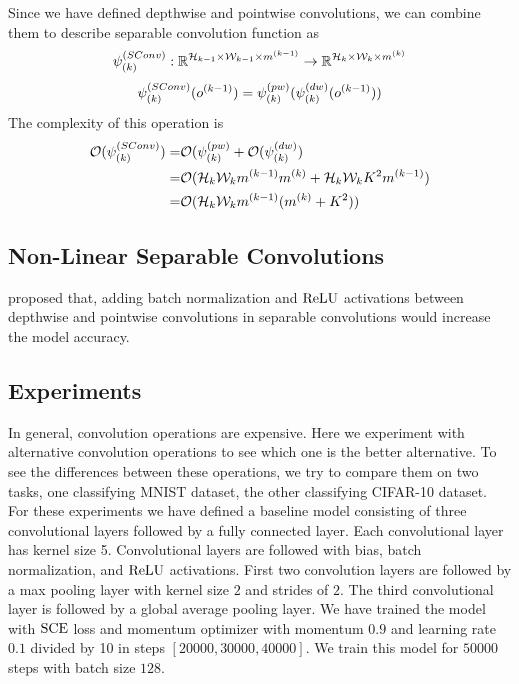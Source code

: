 Since we have defined depthwise and pointwise convolutions, we can combine them to describe separable convolution function as
$$\psi^{(SConv)}_{(k)} : \mathbb{R}^{\mathcal{H}_{k-1} \times \mathcal{W}_{k-1} \times m^{(k-1)}} \rightarrow \mathbb{R}^{\mathcal{H}_{k} \times \mathcal{W}_{k} \times m^{(k)}}$$
$$ \psi^{(SConv)}_{(k)}(o^{(k-1)}) = \psi^{(pw)}_{(k)} ( \psi^{(dw)}_{(k)}(o^{(k-1)}) ) $$
The complexity of this operation is
\begin{equation*}
\begin{split}
\mathcal{O}(\psi^{(SConv)}_{(k)}) =& \mathcal{O}(\psi^{(pw)}_{(k)} + \mathcal{O} (\psi^{(dw)}_{(k)}) \\
=& \mathcal{O}(\mathcal{H}_{k}\mathcal{W}_{k}m^{(k-1)}m^{(k)} + \mathcal{H}_{k}\mathcal{W}_{k}K^2m^{(k-1)}) \\
=& \mathcal{O}(\mathcal{H}_{k}\mathcal{W}_{k}m^{(k-1)}(m^{(k)} + K^2))
\end{split}
 \end{equation*}

\subsection{Non-Linear Separable Convolutions}
\cite{howard2017mobilenets} proposed that, adding batch normalization and $\textrm{ReLU}$ activations between depthwise and pointwise convolutions in separable convolutions would increase the model accuracy. 

\subsection{Experiments}
In general, convolution operations are expensive. Here we experiment with alternative convolution operations to see which one is the better alternative. To see the differences between these operations, we try to compare them on two tasks, one classifying MNIST dataset, the other classifying CIFAR-10 dataset. For these experiments we have defined a baseline model consisting of three convolutional layers followed by a fully connected layer. Each convolutional layer has kernel size 5. Convolutional layers are followed with bias, batch normalization, and $\textrm{ReLU}$ activations. First two convolution layers are followed by a max pooling layer with kernel size $2$ and strides of $2$. The third convolutional layer is followed by a global average pooling layer. We have trained the model with $\textrm{SCE}$ loss and momentum optimizer with momentum $0.9$ and learning rate $0.1$ divided by 10 in steps $[20000, 30000, 40000]$. We train this model for $50000$ steps with batch size $128$. 

